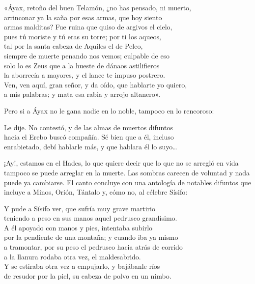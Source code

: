 \begin{versocita}
«Áyax, retoño del buen Telamón, ¿no has pensado, ni muerto,\\
arrinconar ya la saña por esas armas, que hoy siento\\
armas malditas? Fue ruina que quiso de argivos el cielo,\\
pues tú moriste y tú eras su torre; por ti los aqueos,\\
tal por la santa cabeza de Aquiles el de Peleo,\\
siempre de muerte penando nos vemos; culpable de eso\\
solo lo es Zeus que a la hueste de dánaos astilifieros\\
la aborrecía a mayores, y el lance te impuso postrero.\\
Ven, ven aquí, gran señor, y da oído, que hablarte yo quiero,\\
a mis palabras; y mata esa rabia y arrojo altanero».
\end{versocita}

Pero si a Áyax no le gana nadie en lo noble, tampoco en lo rencoroso:

\begin{versocita}
Le dije. No contestó, y de las almas de muertos difuntos\\
hacia el Erebo buscó compañía. Sé bien que a él, incluso\\
enrabietado, debí hablarle más, y que hablara él lo suyo…
\end{versocita}

¡Ay!, estamos en el Hades, lo que quiere decir que lo que no se arregló en vida tampoco se puede arreglar en la muerte. Las sombras carecen de voluntad y nada puede ya cambiarse. El canto concluye con una antología de notables difuntos que incluye a Minos, Orión, Tántalo y, cómo no, al célebre Sísifo:

\begin{versocita}
Y pude a Sísifo ver, que sufría muy grave martirio\\
teniendo a peso en sus manos aquel pedrusco grandísimo.\\
A él apoyado con manos y pies, intentaba subirlo\\
por la pendiente de una montaña; y cuando iba ya mismo\\
a tramontar, por su peso el pedrusco hacia atrás de corrido\\
a la llanura rodaba otra vez, el maldesabrido.\\
Y se estiraba otra vez a empujarlo, y bajábanle ríos\\
de resudor por la piel, su cabeza de polvo en un nimbo.
\end{versocita}

